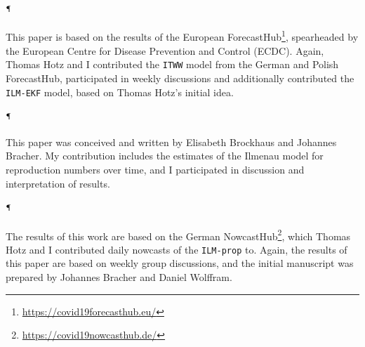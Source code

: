 \begin{refsection}
\paragraph{\cite{Sherratt2022Predictive}$^\mathparagraph$}
This paper is based on the results of the  European ForecastHub\footnote{\url{https://covid19forecasthub.eu/}}, spearheaded by the European Centre for Disease Prevention and Control (ECDC). Again, Thomas Hotz and I contributed the \texttt{ITWW} model from the German and Polish ForecastHub, participated in weekly discussions and additionally contributed the \texttt{ILM-EKF} model, based on Thomas Hotz's initial idea. 

\paragraph{\cite{Brockhaus2023Why}$^\mathparagraph$}
This paper was conceived and written by Elisabeth Brockhaus and Johannes Bracher. My contribution includes the estimates of the Ilmenau model for reproduction numbers over time, and I participated in discussion and interpretation of results. 

\paragraph{\cite{Wolffram2023Collaborative}$^\mathparagraph$}
The results of this work are based on the German NowcastHub\footnote{\url{https://covid19nowcasthub.de/}}, which Thomas Hotz and I contributed daily nowcasts of the \texttt{ILM-prop} to. Again, the results of this paper are based on weekly group discussions, and the initial manuscript was prepared by Johannes Bracher and Daniel Wolffram.\\[18pt]

\printbibliography[heading=custom, title={Own publications}]
\end{refsection}
